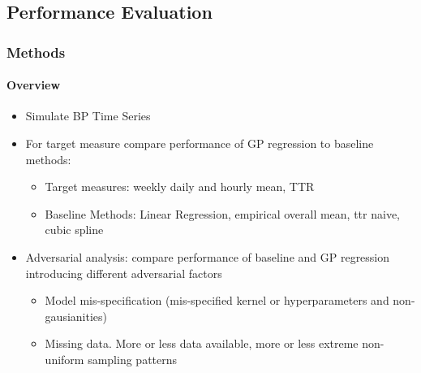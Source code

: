 \documentclass[
	8pt, %
]{beamer}
\begin{document}
\subsection{Performance Evaluation}

\begin{frame}
	\frametitle{Methods}
	\framesubtitle{Overview}

	\begin{itemize}
		\item Simulate BP Time Series
	\end{itemize}

	\bigskip %

	\begin{itemize}
		\item For target measure compare performance of GP regression to baseline methods:
		\begin{itemize}
			\item Target measures: weekly daily and hourly mean, TTR
			\item Baseline Methods: Linear Regression, empirical overall mean, ttr naive, cubic spline
		\end{itemize}
	\end{itemize}

	\bigskip %

	\begin{itemize}
		\item Adversarial analysis: compare performance of baseline and GP regression introducing different adversarial
		factors
		\begin{itemize}
			\item Model mis-specification (mis-specified kernel or hyperparameters and non-gausianities)
			\item Missing data. More or less data available, more or less extreme non-uniform sampling patterns
		\end{itemize}

	\end{itemize}

\end{frame}
\end{document}
